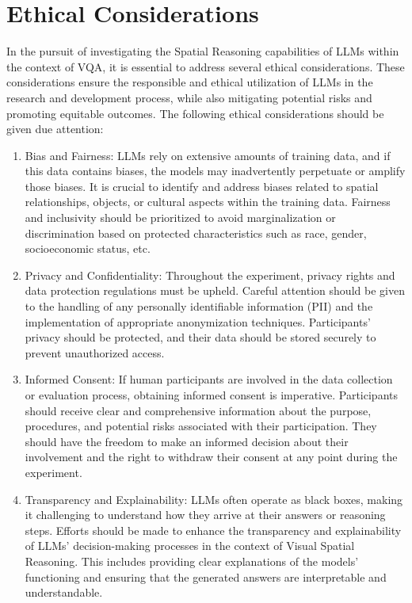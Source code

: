 \documentclass[twocolumn,11pt]{report}
\begin{document}
\section{Ethical Considerations}
In the pursuit of investigating the Spatial Reasoning capabilities of LLMs within the context of VQA, it is essential to address several ethical considerations. These considerations ensure the responsible and ethical utilization of LLMs in the research and development process, while also mitigating potential risks and promoting equitable outcomes. The following ethical considerations should be given due attention:
\begin{enumerate}
    \item Bias and Fairness: LLMs rely on extensive amounts of training data, and if this data contains biases, the models may inadvertently perpetuate or amplify those biases. It is crucial to identify and address biases related to spatial relationships, objects, or cultural aspects within the training data. Fairness and inclusivity should be prioritized to avoid marginalization or discrimination based on protected characteristics such as race, gender, socioeconomic status, etc.
    \item Privacy and Confidentiality: Throughout the experiment, privacy rights and data protection regulations must be upheld. Careful attention should be given to the handling of any personally identifiable information (PII) and the implementation of appropriate anonymization techniques. Participants' privacy should be protected, and their data should be stored securely to prevent unauthorized access.
    \item Informed Consent: If human participants are involved in the data collection or evaluation process, obtaining informed consent is imperative. Participants should receive clear and comprehensive information about the purpose, procedures, and potential risks associated with their participation. They should have the freedom to make an informed decision about their involvement and the right to withdraw their consent at any point during the experiment.
    \item Transparency and Explainability: LLMs often operate as black boxes, making it challenging to understand how they arrive at their answers or reasoning steps. Efforts should be made to enhance the transparency and explainability of LLMs' decision-making processes in the context of Visual Spatial Reasoning. This includes providing clear explanations of the models' functioning and ensuring that the generated answers are interpretable and understandable.

\end{enumerate}
\end{document}
